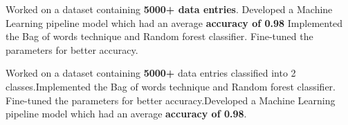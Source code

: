 \documentclass[]{deedy-resume-openfont}
\begin{document}
\begin{minipage}[t]{0.66\textwidth}
\large{Worked on a dataset containing \textbf{5000+ data entries}.
Developed a Machine Learning pipeline model which had an average \textbf{accuracy of 0.98}
Implemented the Bag of words technique and Random forest classifier. Fine-tuned the parameters for better accuracy.}
\sectionsep

\large{Worked on a dataset containing \textbf{5000+} data entries classified into 2 classes.Implemented the Bag of words technique and Random forest classifier. Fine-tuned the parameters for better accuracy.Developed a Machine Learning pipeline model which had an average \textbf{accuracy of 0.98}.}
\sectionsep


\end{minipage} 
\end{document}
